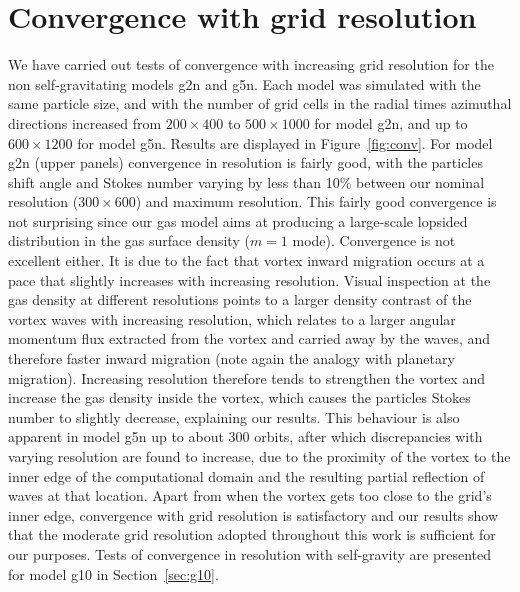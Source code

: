 \documentclass[a4paper,usenatbib]{mnras}
\begin{document}
\section{Convergence with grid resolution}
\label{sec:conv}
We have carried out tests of convergence with increasing grid
resolution for the non self-gravitating models g2n and g5n. Each model
was simulated with the same particle size, and with the number of grid
cells in the radial times azimuthal directions increased from $200
\times 400$ to $500 \times 1000$ for model g2n, and up to $600 \times
1200$ for model g5n. Results are displayed in
Figure~\ref{fig:conv}. For model g2n (upper panels) convergence in
resolution is fairly good, with the particles shift angle and Stokes
number varying by less than 10\% between our nominal resolution
($300\times 600$) and maximum resolution. This fairly good convergence
is not surprising since our gas model aims at producing a large-scale
lopsided distribution in the gas surface density ($m=1$
mode). Convergence is not excellent either. It is due to the fact that
vortex inward migration occurs at a pace that slightly increases with
increasing resolution. Visual inspection at the gas density at
different resolutions points to a larger density contrast of the
vortex waves with increasing resolution, which relates to a larger
angular momentum flux extracted from the vortex and carried away by
the waves, and therefore faster inward migration (note again the
analogy with planetary migration). Increasing resolution therefore
tends to strengthen the vortex and increase the gas density inside the
vortex, which causes the particles Stokes number to slightly decrease,
explaining our results. This behaviour is also apparent in model g5n
up to about 300 orbits, after which discrepancies with varying
resolution are found to increase, due to the proximity of the vortex
to the inner edge of the computational domain and the resulting
partial reflection of waves at that location. Apart from when the
vortex gets too close to the grid's inner edge, convergence with grid
resolution is satisfactory and our results show that the moderate grid
resolution adopted throughout this work is sufficient for our
purposes. Tests of convergence in resolution with self-gravity are
presented for model g10 in Section~\ref{sec:g10}.
\end{document}
